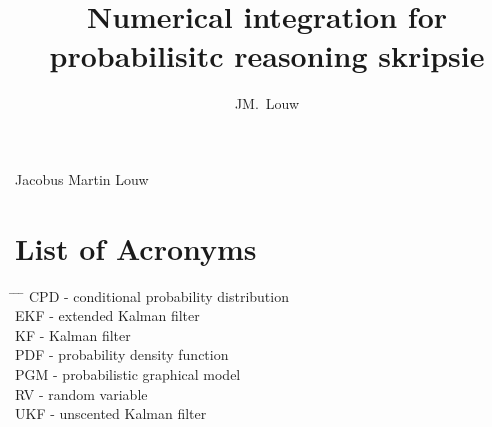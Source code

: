 \documentclass[12pt,oneside,openany,a4paper, %
afrikaans,english,
]{memoir}
\numberwithin{equation}{chapter}
\newcommand*{\WaterMark}[2][0.15\paperwidth]{%
\AddToShipoutPicture*{\AtTextCenter{%
\parbox[c]{0pt}{\makebox[0pt][c]{%
\texttt{[image: \#2]}}}}}}
\begin{document}
\pagestyle{plain}
\frontmatter
\title{Numerical integration for probabilisitc reasoning skripsie}
\author{JM.\ Louw}{Jacobus Martin Louw}
\frontmatter
\WaterMark{UScrest-WM}
\TitlePage

\DeclarationPage

\address{Department of Electrical and Electronic Engineering,\\
University of Stellenbosch,\\
Private Bag X1, 7602 Matieland, South Africa.}
\newpage

\tableofcontents
{}
\pagebreak
\listoffigures

\chapter{List of Acronyms}

\begin{tabbing}
\hspace*{1em}\= \hspace*{5em} \= \hspace*{3em} \= \kill %
\> CPD	\> - \> conditional probability distribution\\
\> EKF	\> - \> extended Kalman filter\\
\> KF	\> - \> Kalman filter\\
\> PDF	\> - \> probability density function\\
\> PGM	\> - \> probabilistic graphical model\\
\> RV \> - \>	random variable\\
\> UKF	\> - \> unscented Kalman filter\\
\end{tabbing}
\end{document}
